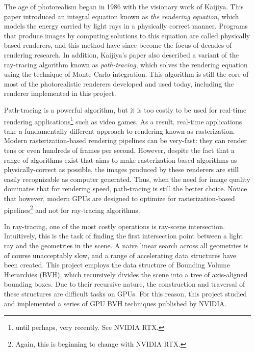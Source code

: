 The age of photorealism began in 1986 with the visionary work of Kaijiya\cite{rendering_equation}. This paper introduced an integral equation known as \textit{the rendering equation}, which models the energy carried by light rays in a physically correct manner. Programs that produce images by computing solutions to this equation are called physically based renderers, and this method have since become the focus of decades of rendering research. In addition, Kaijiya's paper also described a variant of the ray-tracing algorithm known as \textit{path-tracing}, which solves the rendering equation using the technique of Monte-Carlo integration. This algorithm is still the core of most of the photorealistic renderers developed and used today, including the renderer implemented in this project.

Path-tracing is a powerful algorithm, but it is too costly to be used for real-time rendering applications\footnote{until perhaps, very recently. See NVIDIA RTX.} such as video games. As a result, real-time applications take a fundamentally different approach to rendering known as rasterization. Modern rasterization-based rendering pipelines can be very-fast: they can render tens or even hundreds of frames per second. However, despite the fact that a range of algorithms\cite{fernando2005percentage}\cite{sloan2002precomputed}\cite{hanrahan1991rapid} exist that aims to make rasterization based algorithms as physically-correct as possible, the images produced by these renderers are still easily recognizable as computer generated. Thus, when the need for image quality dominates that for rendering speed, path-tracing is still the better choice. Notice that however, modern GPUs are designed to optimize for rasterization-based pipelines\footnote{Again, this is beginning to change with NVIDIA RTX.} and not for ray-tracing algorithms. 

In ray-tracing, one of the most costly operations is ray-scene intersection. Intuitively, this is the task of finding the first intersection point between a light ray and the geometries in the scene. A naive linear search across all geometries is of course unacceptably slow, and a range of accelerating data structures have been created. This project employs the data structure of Bounding Volume Hierarchies (BVH), which recursively divides the scene into a tree of axis-aligned bounding boxes. Due to their recursive nature, the construction and traversal of these structures are difficult tasks on GPUs. For this reason, this project studied and implemented a series of GPU BVH techniques published by NVIDIA\cite{bvh_build}\cite{bvh_optimize}\cite{bvh_traversal}.


